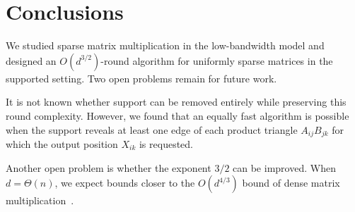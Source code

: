 \section{Conclusions} \label{sec:conclusions}
We studied sparse matrix multiplication in the low-bandwidth model and designed an $O(d^{3/2})$-round algorithm for uniformly sparse matrices in the supported setting. Two open problems remain for future work.

It is not known whether support can be removed entirely while preserving this round complexity. However, we found that an equally fast algorithm is possible when the support reveals at least one edge of each product triangle $A_{ij}B_{jk}$ for which the output position $X_{ik}$ is requested.

Another open problem is whether the exponent $3/2$ can be improved. When $d=\Theta(n)$, we expect bounds closer to the $O(d^{4/3})$ bound of dense matrix multiplication~\cite{censor-hillel-kaski-etal-2019-algebraic-methods-in-the}.



